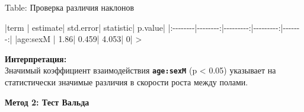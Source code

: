 \documentclass[
  letterpaper,
  DIV=11,
  numbers=noendperiod]{scrreprt}
\newenvironment{Shaded}{\begin{snugshade}}{\end{snugshade}}
\newcommand{\DecValTok}[1]{\textcolor[rgb]{0.68,0.00,0.00}{#1}}
\newcommand{\ErrorTok}[1]{\textcolor[rgb]{0.68,0.00,0.00}{#1}}
\newcommand{\FloatTok}[1]{\textcolor[rgb]{0.68,0.00,0.00}{#1}}
\newcommand{\NormalTok}[1]{\textcolor[rgb]{0.00,0.23,0.31}{#1}}
\newcommand{\SpecialCharTok}[1]{\textcolor[rgb]{0.37,0.37,0.37}{#1}}
\begin{document}
\begin{Shaded}
\begin{Highlighting}[]
\NormalTok{Table}\SpecialCharTok{:}\NormalTok{ Проверка различия наклонов}

\SpecialCharTok{|}\NormalTok{term     }\SpecialCharTok{|}\NormalTok{ estimate}\SpecialCharTok{|}\NormalTok{ std.error}\SpecialCharTok{|}\NormalTok{ statistic}\SpecialCharTok{|}\NormalTok{ p.value}\SpecialCharTok{|}
\ErrorTok{|:}\SpecialCharTok{{-}{-}{-}{-}{-}{-}{-}{-}}\ErrorTok{|}\SpecialCharTok{{-}{-}{-}{-}{-}{-}{-}{-}}\ErrorTok{:|}\SpecialCharTok{{-}{-}{-}{-}{-}{-}{-}{-}{-}}\ErrorTok{:|}\SpecialCharTok{{-}{-}{-}{-}{-}{-}{-}{-}{-}}\ErrorTok{:|}\SpecialCharTok{{-}{-}{-}{-}{-}{-}{-}}\ErrorTok{:|}
\ErrorTok{|}\NormalTok{age}\SpecialCharTok{:}\NormalTok{sexM }\SpecialCharTok{|}     \FloatTok{1.86}\SpecialCharTok{|}     \FloatTok{0.459}\SpecialCharTok{|}     \FloatTok{4.053}\SpecialCharTok{|}       \DecValTok{0}\SpecialCharTok{|}
\ErrorTok{\textgreater{}} 
\end{Highlighting}
\end{Shaded}

\textbf{Интерпретация:}\\
Значимый коэффициент взаимодействия \textbf{\texttt{age:sexM}} (p
\textless{} 0.05) указывает на статистически значимые различия в
скорости роста между полами.

\textbf{Метод 2: Тест Вальда}
\end{document}
